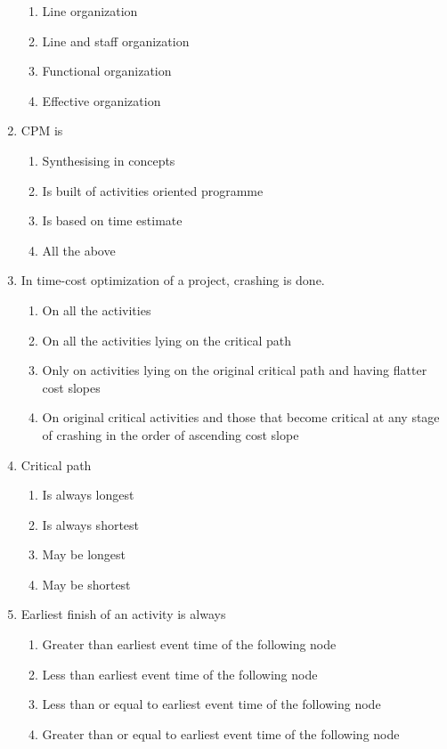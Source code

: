 \documentclass[11pt,a4paper]{article}
\begin{document}
\begin{enumerate}
\begin{enumerate}[label=\Alph*.]
\item{Line organization}
\item{Line and staff organization}
\item{Functional organization}
\item{Effective organization}
\end{enumerate}
\item{CPM is}
\begin{enumerate}[label=\Alph*.]
\item{Synthesising in concepts}
\item{Is built of activities oriented programme}
\item{Is based on time estimate}
\item{All the above}
\end{enumerate}
\item{In time-cost optimization of a project, crashing is done.}
\begin{enumerate}[label=\Alph*.]
\item{On all the activities}
\item{On all the activities lying on the critical path}
\item{Only on activities lying on the original critical path and having flatter cost slopes}
\item{On original critical activities and those that become critical at any stage of crashing in the order of ascending cost slope}
\end{enumerate}
\item{Critical path}
\begin{enumerate}[label=\Alph*.]
\item{Is always longest}
\item{Is always shortest}
\item{May be longest}
\item{May be shortest}
\end{enumerate}
\item{Earliest finish of an activity is always}
\begin{enumerate}[label=\Alph*.]
\item{Greater than earliest event time of the following node}
\item{Less than earliest event time of the following node}
\item{Less than or equal to earliest event time of the following node}
\item{Greater than or equal to earliest event time of the following node}

\end{enumerate}
\end{enumerate}
\end{document}
